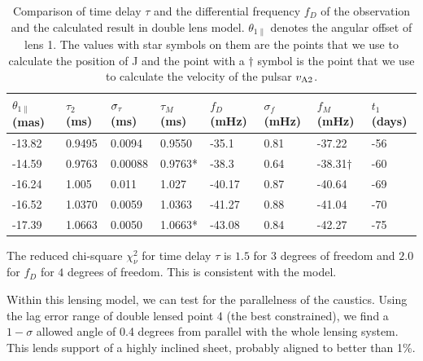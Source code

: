\documentclass[useAMS,usenatbib]{mn2e}
\begin{document}
\begin{table}
\centering
\begin{tabular}{llllllll}
\hline
$\theta_{1\parallel}$ (mas)  & $\tau_2$(ms) & $\sigma_{\rm \tau}$(ms)  & $\tau_M$(ms) & $f_D$(mHz)  &$\sigma_{f}$(mHz)      &  $f_M$(mHz)& $t_1$(days) \\ \hline
-13.82  &    0.9495     &0.0094    & 0.9550       & -35.1     &0.81    & -37.22          & -56\\ 
-14.59  &   0.9763    &0.00088   & 0.9763*       & -38.3     &0.64    & -38.31$\dagger$ & -60\\ 
-16.24  &   1.005    &0.011   & 1.027          & -40.17    &0.87   & -40.64          & -69\\ 
-16.52  &    1.0370     &0.0059    & 1.0363       & -41.27    &0.88   & -41.04          & -70\\ 
-17.39  &  1.0663     &0.0050    & 1.0663*        & -43.08    &0.84   & -42.27           & -75\\ \hline
\end{tabular}
\caption{Comparison of time delay $\tau$ and the differential frequency $f_D$ of the observation and the calculated result in double lens model. $\theta_{1\parallel}$ denotes the angular offset of lens 1. 
The values with star symbols on them are the points that we use to calculate the position of J and the point with a $\dagger$ symbol is the point that we use to calculate the velocity of the pulsar $v_{\rm A2}$. }
\label{table:double_lens_compare}
\end{table}

The reduced chi-square ${\chi}^2_{\nu}$ for time delay $\tau$ is $1.5$
for $3$ degrees of freedom
and $2.0$ for $f_D$ for $4$ degrees of freedom.  This is consistent
with the model.


Within this lensing model, we can test for the parallelness of the
caustics.  Using the lag error range of double lensed point 4 (the best
constrained), we find a $1-\sigma$ allowed angle of 0.4 degrees from
parallel with the whole lensing system.  This lends support of a
highly inclined sheet, probably aligned to better than 1\%.
\end{document}
